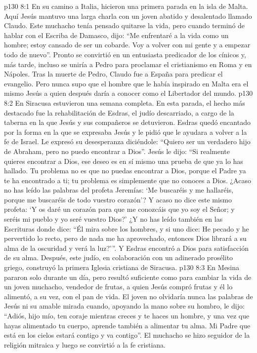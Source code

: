 \vs p130 8:1 En su camino a Italia, hicieron una primera parada en la isla de Malta. Aquí Jesús mantuvo una larga charla con un joven abatido y desalentado llamado Claudo. Este muchacho tenía pensado quitarse la vida, pero cuando terminó de hablar con el Escriba de Damasco, dijo: “Me enfrentaré a la vida como un hombre; estoy cansado de ser un cobarde. Voy a volver con mi gente y a empezar todo de nuevo”. Pronto se convirtió en un entusiasta predicador de los cínicos y, más tarde, incluso se uniría a Pedro para proclamar el cristianismo en Roma y en Nápoles. Tras la muerte de Pedro, Claudo fue a España para predicar el evangelio. Pero nunca supo que el hombre que le había inspirado en Malta era el mismo Jesús a quien después daría a conocer como el Libertador del mundo.
\vs p130 8:2 \pc En Siracusa estuvieron una semana completa. En esta parada, el hecho más destacado fue la rehabilitación de Esdras, el judío descarriado, a cargo de la taberna en la que Jesús y sus compañeros se detuvieron. Esdras quedó encantado por la forma en la que se expresaba Jesús y le pidió que le ayudara a volver a la fe de Israel. Le expresó su desesperanza diciéndole: “Quiero ser un verdadero hijo de Abraham, pero no puedo encontrar a Dios”. Jesús le dijo: “Si realmente quieres encontrar a Dios, ese deseo es en sí mismo una prueba de que ya lo has hallado. Tu problema no es que no puedas encontrar a Dios, porque el Padre ya te ha encontrado a ti; tu problema es simplemente que no conoces a Dios. ¿Acaso no has leído las palabras del profeta Jeremías: ‘Me buscaréis y me hallaréis, porque me buscaréis de todo vuestro corazón’? Y acaso no dice este mismo profeta: ‘Y os daré un corazón para que me conozcáis que yo soy el Señor; y seréis mi pueblo y yo seré vuestro Dios?’ ¿Y no has leído también en las Escrituras donde dice: “Él mira sobre los hombres, y si uno dice: He pecado y he pervertido lo recto, pero de nada me ha aprovechado, entonces Dios librará a su alma de la oscuridad y verá la luz?’”. Y Esdras encontró a Dios para satisfacción de su alma. Después, este judío, en colaboración con un adinerado prosélito griego, construyó la primera Iglesia cristiana de Siracusa.
\vs p130 8:3 \pc En Mesina pararon solo durante un día, pero resultó suficiente como para cambiar la vida de un joven muchacho, vendedor de frutas, a quien Jesús compró frutas y él lo alimentó, a su vez, con el pan de vida. El joven no olvidaría nunca las palabras de Jesús ni su amable mirada cuando, apoyando la mano sobre su hombro, le dijo: “Adiós, hijo mío, ten coraje mientras creces y te haces un hombre, y una vez que hayas alimentado tu cuerpo, aprende también a alimentar tu alma. Mi Padre que está en los cielos estará contigo y va contigo”. El muchacho se hizo seguidor de la religión mitraica y luego se convirtió a la fe cristiana.
